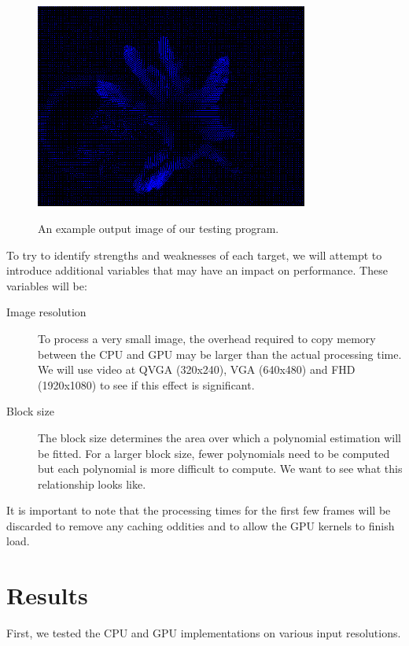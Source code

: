 \documentclass[12pt,letterpaper]{article}
\begin{document}
\begin{figure}[h]
  \centering
  \includegraphics[width=0.8\textwidth]{img/flow.png}
  \label{fig:flow}
  \caption{An example output image of our testing program.}
\end{figure}

To try to identify strengths and weaknesses of each target, we will attempt to
introduce additional variables that may have an impact on performance. These
variables will be:

\begin{description}
  \item[Image resolution] To process a very small image, the overhead required
    to copy memory between the CPU and GPU may be larger than the actual
    processing time. We will use video at QVGA (320x240), VGA (640x480) and FHD
    (1920x1080) to see if this effect is significant.
  \item[Block size] The block size determines the area over which a polynomial
    estimation will be fitted. For a larger block size, fewer polynomials need
    to be computed but each polynomial is more difficult to compute. We want to
    see what this relationship looks like.
\end{description}

It is important to note that the processing times for the first few frames will
be discarded to remove any caching oddities and to allow the GPU kernels to
finish load.

\section{Results}

First, we tested the CPU and GPU implementations on various input resolutions.
\end{document}
